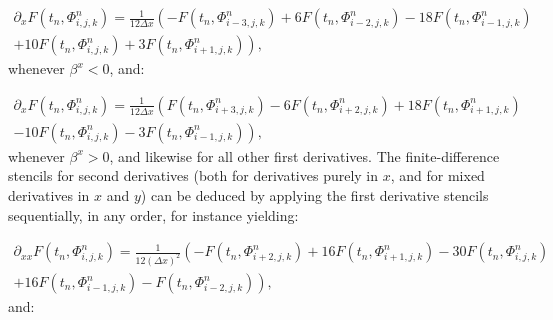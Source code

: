 \documentclass{article}
\begin{document}
\begin{multline}
\partial_x F \left( t_n, \Phi_{i, j, k}^{n} \right) = \frac{1}{12 \Delta x} \left( - F \left( t_n, \Phi_{i - 3, j, k}^{n} \right) + 6 F \left( t_n, \Phi_{i - 2, j, k}^{n} \right) - 18 F \left( t_n, \Phi_{i - 1, j, k}^{n} \right) \right.\\
\left. + 10 F \left( t_n, \Phi_{i, j, k}^{n} \right) + 3 F \left( t_n, \Phi_{i + 1, j, k}^{n} \right) \right),
\end{multline}
whenever ${\beta^x < 0}$, and:

\begin{multline}
\partial_x F \left( t_n, \Phi_{i, j, k}^{n} \right) = \frac{1}{12 \Delta x} \left( F \left( t_n, \Phi_{i + 3, j, k}^{n} \right) - 6 F \left( t_n, \Phi_{i + 2, j, k}^{n} \right) + 18 F \left( t_n, \Phi_{i + 1, j, k}^{n} \right) \right.\\
\left. - 10 F \left( t_n, \Phi_{i, j, k}^{n} \right) - 3 F \left( t_n, \Phi_{i - 1, j, k}^{n} \right) \right),
\end{multline}
whenever ${\beta^x > 0}$, and likewise for all other first derivatives. The finite-difference stencils for second derivatives (both for derivatives purely in $x$, and for mixed derivatives in $x$ and $y$) can be deduced by applying the first derivative stencils sequentially, in any order, for instance yielding:

\begin{multline}
\partial_{x x} F \left( t_n, \Phi_{i, j, k}^{n} \right) = \frac{1}{12 \left( \Delta x \right)^2} \left( -F \left( t_n, \Phi_{i + 2, j, k}^{n} \right) + 16 F \left( t_n, \Phi_{i + 1, j, k}^{n} \right) - 30 F \left( t_n, \Phi_{i, j, k}^{n} \right) \right.\\
\left. + 16 F \left( t_n, \Phi_{i - 1, j, k}^{n} \right) - F \left( t_n, \Phi_{i - 2, j, k}^{n} \right) \right),
\end{multline}
and:
\end{document}
